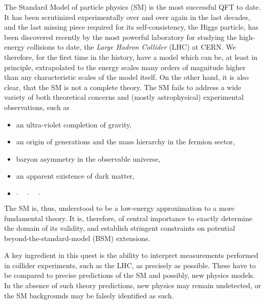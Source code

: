 The Standard Model of particle physics (SM) is the most successful QFT to date.
It has been scrutinized experimentally over and over again in the last decades, and the
last missing piece required for its self-consistency, the Higgs particle, has been discovered recently by the most
powerful laboratory for studying  the high-energy collisions to date, the \emph{Large Hadron Collider} (LHC) at CERN.
We therefore, for the first time in the history, have a model which can be, at least in principle, extrapolated to the energy scales many orders of magnitude higher than
any characteristic scales of the model itself.
On the other hand, it is also clear, that the SM is not a complete theory.
The SM fails to address a wide variety of both theoretical concerns and (mostly astrophysical) experimental observations, such as
\begin{itemize}[nosep,topsep=-1.6ex]
  \item an ultra-violet completion of gravity,
  \item an origin of generations and the mass hierarchy in the fermion sector,
  \item baryon asymmetry in the observable universe, 
  \item an apparent existence of dark matter,
  \item[]  $\cdot\quad\cdot\quad\cdot$ %
\end{itemize}
The SM is, thus, understood to be a low-energy approximation to a more fundamental theory.
It is, therefore, of central importance to exactly determine the domain of its validity,
and establish stringent constraints on potential beyond-the-standard-model (BSM) extensions.

A key ingredient in this quest is the ability to interpret measurements performed in collider experiments, such as the LHC, as precisely as possible.
These have to be compared to precise predictions of the SM and possibly, new physics models.
In the absence of such theory predictions, new physics may remain undetected, or the SM backgrounds may be falsely identified as such.

